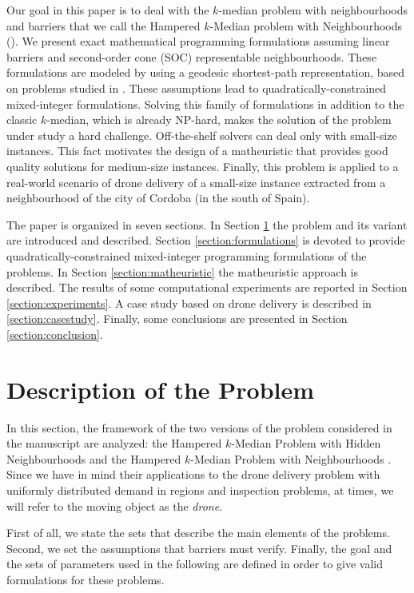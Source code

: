 \documentclass[a4paper,  review, authoryear, 1p.]{elsarticle}
\newcommand{\KMPHN}{{\sf{H-KMPHN}}}
\newcommand{\KMPN}{{\sf{H-KMPN}\xspace }}
\newcommand{\JP}[1]{{\color{armygreen}#1}}
\newcommand{\CV}[1]{{\color{blue}#1}}
\begin{document}
	Our goal in this paper is to deal with the $k$-median problem with neighbourhoods and barriers that we call the Hampered $k$-Median problem with Neighbourhoods (\KMPN). We present exact mathematical programming formulations assuming linear barriers and second-order cone (SOC) representable neighbourhoods. These formulations are modeled by using a geodesic shortest-path representation, based on problems studied in \citet{mitchell2017}. These assumptions lead to quadratically-constrained mixed-integer formulations. Solving this family of formulations in addition to the classic $k$-median, \JP{which is already NP-hard}, makes the solution of the problem under study a hard challenge. \CV{Off}-the-shelf solvers can deal only with small-size instances. This fact motivates the design of a matheuristic that provides good quality solutions for medium-size instances. \JP{Finally, this problem is applied to a real-world scenario of drone delivery of a small-size instance extracted from a neighbourhood of the city of Cordoba (in the south of Spain).}
	
	The paper is organized in seven sections. In Section \ref{section:description} the problem and its variant are introduced and described. Section \ref{section:formulations} is devoted to provide quadratically-constrained mixed-integer programming formulations of the problems. In Section \ref{section:matheuristic} the matheuristic approach is described. The results of some computational experiments are reported in Section \ref{section:experiments}. \CV{A case study based on drone delivery is described in \ref{section:casestudy}}. Finally, some conclusions are presented in Section \ref{section:conclusion}.
	
	
	\section{Description of the Problem}\label{section:description}
	In this section, the framework of the two versions of the problem considered in the manuscript are analyzed: the Hampered $k$-Median Problem with Hidden Neighbourhoods \KMPHN\xspace and the Hampered $k$-Median Problem with Neighbourhoods \KMPN. Since we have in mind their applications to the drone delivery problem with uniformly distributed demand in regions and inspection problems, at times, we will refer to the moving object as the \textit{drone}.
	
	First of all, we state the sets that describe the main elements of the problems. Second, we set the assumptions that barriers must verify. Finally, the goal and the sets of  parameters used in the following are defined in order to give valid formulations for these problems.
	
\end{document}
